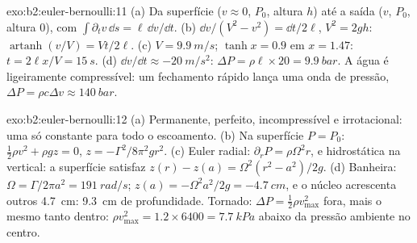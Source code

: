\begin{solution}{exo:b2:euler-bernoulli:11}
(a) Da superfície ($v \approx 0$, $P_0$, altura $h$) até a saída ($v$, $P_0$,
altura $0$), com $\int\partial_tv\,\dd s = \ell\,\dd v/\dd t$. (b) $\dd v/(V^2 -
v^2) = \dd t/2\ell$, $V^2 = 2gh$: $\operatorname{artanh}(v/V) = Vt/2\ell$. (c) $V =
\qty{9.9}{m/s}$; $\tanh x = 0.9$ em $x = 1.47$: $t = 2\ell x/V = \qty{15}{s}$. (d)
$\dd v/\dd t \approx \qty{-20}{m/s^2}$: $\Delta P = \rho\ell \times 20 = \qty{9.9}{bar}$.
A água é ligeiramente compressível: um fechamento rápido lança uma onda de
pressão, $\Delta P = \rho c\Delta v \approx \qty{140}{bar}$.
\end{solution}

\begin{solution}{exo:b2:euler-bernoulli:12}
(a) Permanente, perfeito, incompressível e irrotacional: uma só constante
para todo o escoamento. (b) Na superfície $P = P_0$: $\tfrac12\rho v^2 + \rho gz =
0$, $z = -\Gamma^2/8\pi^2gr^2$. (c) Euler radial: $\partial_rP = \rho\Omega^2r$,
e hidrostática na vertical: a superfície satisfaz $z(r) - z(a) = \Omega^2(r^2 -
a^2)/2g$. (d) Banheira: $\Omega = \Gamma/2\pi a^2 = \qty{191}{rad/s}$; $z(a) = -\Omega^2a^2/
2g = \qty{-4.7}{cm}$, e o núcleo acrescenta outros \qty{4.7}{cm}: \qty{9.3}{cm} de profundidade.
Tornado: $\Delta P = \tfrac12\rho v_{\max}^2$ fora, mais o mesmo tanto dentro:
$\rho v_{\max}^2 = 1.2 \times 6400 = \qty{7.7}{kPa}$ abaixo da pressão ambiente no centro.
\end{solution}


